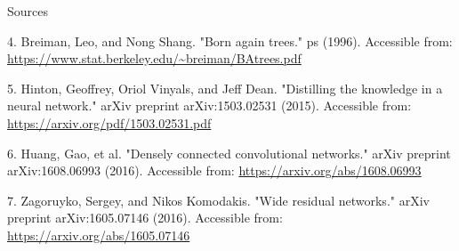 \documentclass{beamer}
\begin{document}
\begin{frame}{Sources}

\begin{thebibliography}{0}
   4. Breiman, Leo, and Nong Shang. "Born again trees." ps (1996). Accessible from: \url{https://www.stat.berkeley.edu/~breiman/BAtrees.pdf}
  
   5. Hinton, Geoffrey, Oriol Vinyals, and Jeff Dean. "Distilling the knowledge in a neural network." arXiv preprint arXiv:1503.02531 (2015). Accessible from: \url{https://arxiv.org/pdf/1503.02531.pdf}
  
   6. Huang, Gao, et al. "Densely connected convolutional networks." arXiv preprint arXiv:1608.06993 (2016). Accessible from: \url{https://arxiv.org/abs/1608.06993}
  
   7. Zagoruyko, Sergey, and Nikos Komodakis. "Wide residual networks." arXiv preprint arXiv:1605.07146 (2016). Accessible from: \url{https://arxiv.org/abs/1605.07146}
\end{thebibliography}

\end{frame}
 
 
 
\end{document}
